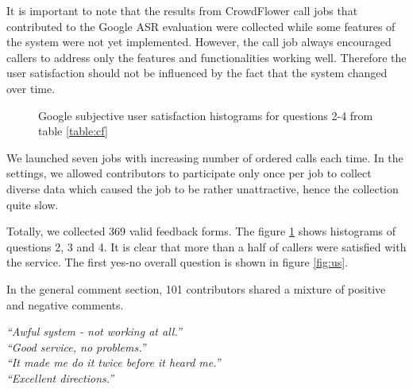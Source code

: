 It is important to note that the results from CrowdFlower call jobs that contributed to the Google ASR evaluation were collected while some features of the system were not yet implemented.
However, the call job always encouraged callers to address only the features and functionalities working well.
Therefore the user satisfaction should not be influenced by the fact that the system changed over time.

\begin{figure}[ht]
\caption{Google subjective user satisfaction histograms for questions 2-4 from table \ref{table:cf}}
\label{fig:google}
\end{figure}

We launched seven jobs with increasing number of ordered calls each time.
In the settings, we allowed contributors to participate only once per job to collect diverse data which caused the job to be rather unattractive, hence the collection quite slow.

Totally, we collected 369 valid feedback forms.
The figure \ref{fig:google} shows histograms of questions 2, 3 and 4.
It is clear that more than a half of callers were satisfied with the service.
The first yes-no overall question is shown in figure \ref{fig:us}.

In the general comment section, 101 contributors shared a mixture of positive and negative comments.

\begin{flushleft}
\textit{``Awful system - not working at all.''} \\
\textit{``Good service, no problems.''} \\
\textit{``It made me do it twice before it heard me.''} \\
\textit{``Excellent directions.''} \\
\end{flushleft}

